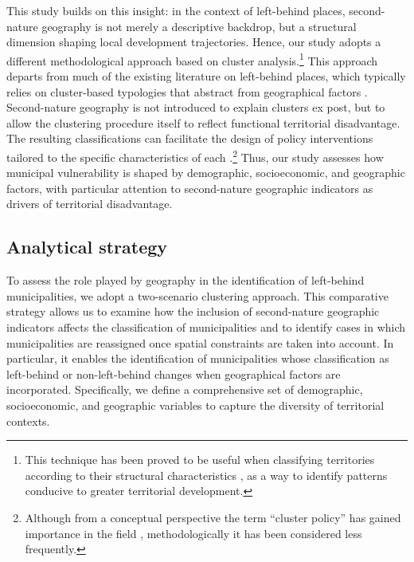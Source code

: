 \documentclass[a4paper,11pt,oneside]{article}
\begin{document}
This study builds on this insight: in the context of left-behind places, second-nature geography is not merely a descriptive backdrop, but a structural dimension shaping local development trajectories.  Hence, our study adopts a different methodological approach based on cluster analysis.\footnote{This technique has been proved to be useful when classifying territories according to their  structural characteristics \citep[see, for instance][]{ebbekink2013s}, as a way to identify patterns conducive to greater territorial development.} This approach departs from much of the existing literature on left-behind places, which typically relies on cluster-based typologies that abstract from geographical factors \citep{le2025identifying, velthuis2024regional, hedlund2016mapping, jessen2024role, kronthaler2005economic}. Second-nature geography is not introduced to explain clusters ex post, but to allow the clustering procedure itself to reflect functional territorial disadvantage. The resulting classifications can facilitate the design of policy interventions tailored to the specific characteristics of each     .\footnote{Although from a conceptual perspective the term ``cluster policy'' has gained importance in the field \citep{brakman2013reflections}, methodologically it has been considered less frequently.} Thus, our study assesses how municipal vulnerability is shaped by demographic, socioeconomic, and geographic factors, with particular attention to second-nature geographic indicators as drivers of territorial disadvantage.




\subsection{Analytical strategy}
\label{sec:analytical_strategy}


To assess the role played by geography in the identification of left-behind municipalities, we adopt a two-scenario clustering approach. This comparative strategy allows us to examine how the inclusion of second-nature geographic indicators affects the classification of municipalities and to identify cases in which municipalities are reassigned once spatial constraints are taken into account. In particular, it enables the identification of municipalities whose classification as left-behind or non-left-behind changes when geographical factors are incorporated. Specifically, we define a comprehensive set of demographic, socioeconomic, and geographic variables to capture the diversity of territorial contexts.
\end{document}
